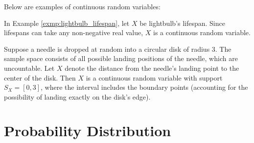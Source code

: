 Below are examples of continuous random variables:

\begin{exmp}
    In Example \autoref{exmp:lightbulb_lifespan}, let \( X \) be lightbulb's lifespan.
    Since lifespans can take any non-negative real value, \( X \) is a continuous random variable.
\end{exmp}

\begin{exmp}
    Suppose a needle is dropped at random into a circular disk of radius 3.
    The sample space consists of all possible landing positions of the needle, which are uncountable.
    Let \( X \) denote the distance from the needle's landing point to the center of the disk.
    Then \( X \) is a continuous random variable with support \( S_{X} = [0, 3] \),
    where the interval includes the boundary points (accounting for the possibility of landing exactly on the disk's edge).
\end{exmp}

\section{Probability Distribution}

